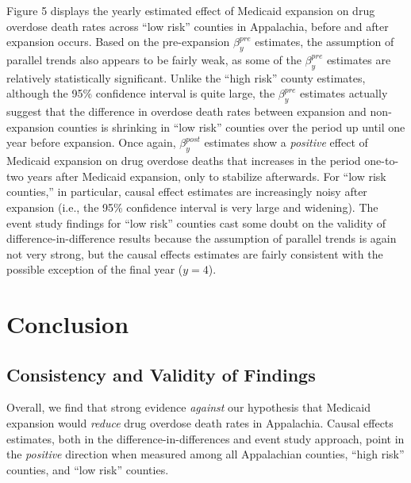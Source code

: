 \documentclass[
  11pt,
]{article}
\begin{document}
Figure 5 displays the yearly estimated effect of Medicaid expansion on
drug overdose death rates across ``low risk'' counties in Appalachia,
before and after expansion occurs. Based on the pre-expansion
\(\beta^{pre}_y\) estimates, the assumption of parallel trends also
appears to be fairly weak, as some of the \(\beta^{pre}_y\) estimates
are relatively statistically significant. Unlike the ``high risk''
county estimates, although the 95\% confidence interval is quite large,
the \(\beta^{pre}_y\) estimates actually suggest that the difference in
overdose death rates between expansion and non-expansion counties is
shrinking in ``low risk'' counties over the period up until one year
before expansion. Once again, \(\beta^{post}_y\) estimates show a
\emph{positive} effect of Medicaid expansion on drug overdose deaths
that increases in the period one-to-two years after Medicaid expansion,
only to stabilize afterwards. For ``low risk counties,'' in particular,
causal effect estimates are increasingly noisy after expansion (i.e.,
the 95\% confidence interval is very large and widening). The event
study findings for ``low risk'' counties cast some doubt on the validity
of difference-in-difference results because the assumption of parallel
trends is again not very strong, but the causal effects estimates are
fairly consistent with the possible exception of the final year
(\(y=4\)).

\medspace

\hypertarget{conclusion}{%
\section{Conclusion}\label{conclusion}}

\hypertarget{consistency-and-validity-of-findings}{%
\subsection{Consistency and Validity of
Findings}\label{consistency-and-validity-of-findings}}

Overall, we find that strong evidence \emph{against} our hypothesis that
Medicaid expansion would \emph{reduce} drug overdose death rates in
Appalachia. Causal effects estimates, both in the
difference-in-differences and event study approach, point in the
\emph{positive} direction when measured among all Appalachian counties,
``high risk'' counties, and ``low risk'' counties.
\end{document}
